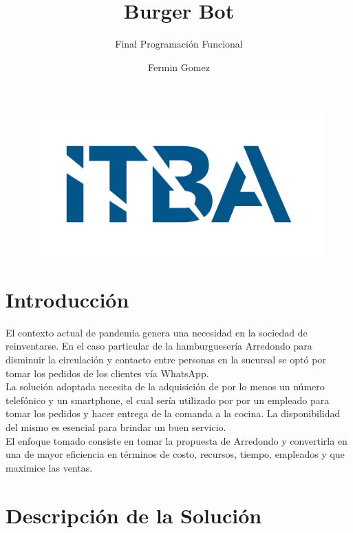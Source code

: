 \documentclass[a4paper,12pt]{article}
\title{Burger Bot}
\subtitle{Final Programación Funcional}
\author{Fermin Gomez}
\begin{document}
\maketitle

\begin{figure}[H]
	\centering
	\includegraphics[width=0.7\linewidth]{itba}
\end{figure}

\pagebreak

\tableofcontents

\pagebreak

\section{Introducción}

El contexto actual de pandemia genera una necesidad en la sociedad de reinventarse. En el caso particular de la hamburguesería Arredondo para disminuir la circulación y contacto entre personas en la sucursal se optó por tomar los pedidos de los clientes vía WhatsApp. 
\\
La solución adoptada necesita de la adquisición de por lo menos un número telefónico y un smartphone, el cual sería utilizado por por un empleado para tomar los pedidos y hacer entrega de la comanda a la cocina. La disponibilidad del mismo es esencial para brindar un buen servicio. 
\\
El enfoque tomado consiste en tomar la propuesta de Arredondo y convertirla en una de mayor eficiencia en términos de costo, recursos, tiempo, empleados y que maximice las ventas.  

\section{Descripción de la Solución}
\end{document}
